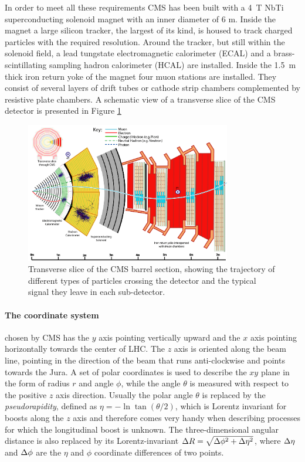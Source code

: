 In order to meet all these requirements CMS has been built with a 4~T NbTi superconducting solenoid magnet with an inner diameter of 6 m. Inside the magnet a large silicon tracker, the largest of its kind, is housed to track charged particles with the required resolution. Around the tracker, but still within the solenoid field, a lead tungstate electromagnetic calorimeter (ECAL) and a brass-scintillating sampling hadron calorimeter (HCAL) are installed. Inside the 1.5~m thick iron return yoke of the magnet four muon stations are installed. They consist of several layers of drift tubes or cathode strip chambers complemented by resistive plate chambers. A schematic view of a transverse slice of the CMS detector is presented in Figure \ref{fig:cmsdet}

\begin{figure}
\begin{center}
\includegraphics[angle=-0,width=0.8\textwidth]{2_LHC_and_CMS/pics/CMS_Slice_HD.png}
\caption{Transverse slice of the CMS barrel section, showing the trajectory of different types of particles crossing the detector and the typical signal they leave in each sub-detector.
\label{fig:cmsdet}
}
\end{center}
\end{figure}


\paragraph{The coordinate system}
chosen by CMS has the $y$ axis pointing vertically upward and the $x$ axis pointing horizontally towards the center of LHC. The $z$ axis is oriented along the beam line, pointing in the direction of the beam that runs anti-clockwise and points towards the Jura. A set of polar coordinates is used to describe the $xy$ plane in the form of radius $r$ and angle $\phi$, while the angle $\theta$ is measured with respect to the positive $z$ axis direction. Usually the polar angle $\theta$ is replaced by the \emph{pseudorapidity}, defined as $\eta=-\ln \tan(\theta/2)$, which is Lorentz invariant for boosts along the $z$ axis and therefore comes very handy when describing processes for which the longitudinal boost is unknown. The three-dimensional angular distance is also replaced by its Lorentz-invariant $\Delta R=\sqrt{\Delta\phi^2+\Delta\eta^2}$, where $\Delta\eta$ and $\Delta\phi$ are the $\eta$ and $\phi$ coordinate differences of two points.


